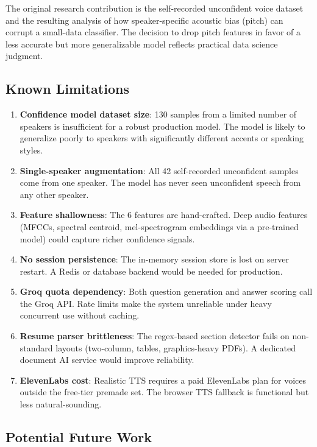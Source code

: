 \documentclass[12pt,a4paper]{article}
\begin{document}
The original research contribution is the self-recorded unconfident voice dataset and the resulting analysis of how speaker-specific acoustic bias (pitch) can corrupt a small-data classifier. The decision to drop pitch features in favor of a less accurate but more generalizable model reflects practical data science judgment.

\subsection{Known Limitations}

\begin{enumerate}[leftmargin=2em]
  \item \textbf{Confidence model dataset size}: 130 samples from a limited number of speakers is insufficient for a robust production model. The model is likely to generalize poorly to speakers with significantly different accents or speaking styles.
  \item \textbf{Single-speaker augmentation}: All 42 self-recorded unconfident samples come from one speaker. The model has never seen unconfident speech from any other speaker.
  \item \textbf{Feature shallowness}: The 6 features are hand-crafted. Deep audio features (MFCCs, spectral centroid, mel-spectrogram embeddings via a pre-trained model) could capture richer confidence signals.
  \item \textbf{No session persistence}: The in-memory session store is lost on server restart. A Redis or database backend would be needed for production.
  \item \textbf{Groq quota dependency}: Both question generation and answer scoring call the Groq API. Rate limits make the system unreliable under heavy concurrent use without caching.
  \item \textbf{Resume parser brittleness}: The regex-based section detector fails on non-standard layouts (two-column, tables, graphics-heavy PDFs). A dedicated document AI service would improve reliability.
  \item \textbf{ElevenLabs cost}: Realistic TTS requires a paid ElevenLabs plan for voices outside the free-tier premade set. The browser TTS fallback is functional but less natural-sounding.
\end{enumerate}

\subsection{Potential Future Work}
\end{document}
